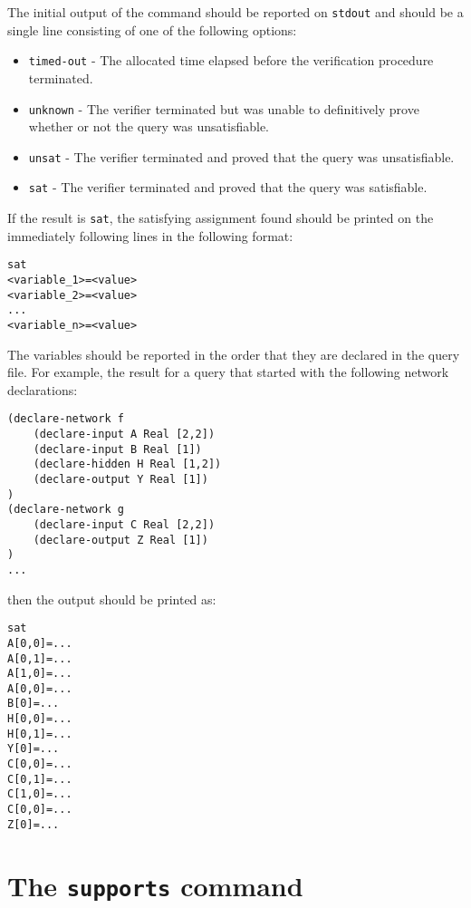

\noindent The initial output of the command should be reported on \texttt{stdout} and should be a single line consisting of one of the following options: 
\begin{itemize}
\item \texttt{timed-out} - The allocated time elapsed before the verification procedure terminated.
\item \texttt{unknown} - The verifier terminated but was unable to definitively prove whether or not the query was unsatisfiable.
\item \texttt{unsat} - The verifier terminated and proved that the query was unsatisfiable.
\item \texttt{sat} - The verifier terminated and proved that the query was satisfiable.
\end{itemize}
If the result is \texttt{sat}, the satisfying assignment found should be printed on the immediately following lines in the following format:
\begin{lstlisting}[style=bash]
sat
<variable_1>=<value>
<variable_2>=<value>
...
<variable_n>=<value>
\end{lstlisting}
The variables should be reported in the order that they are declared in the query file. For example, the result for a \vnnlib{} query that started with the following network declarations:
\begin{lstlisting}[style=bash]
(declare-network f
    (declare-input A Real [2,2])
    (declare-input B Real [1])
    (declare-hidden H Real [1,2])
    (declare-output Y Real [1])
)
(declare-network g
    (declare-input C Real [2,2])
    (declare-output Z Real [1])
)
...
\end{lstlisting}
then the output should be printed as:
\begin{lstlisting}[style=bash]
sat
A[0,0]=...
A[0,1]=...
A[1,0]=...
A[0,0]=...
B[0]=...
H[0,0]=...
H[0,1]=...
Y[0]=...
C[0,0]=...
C[0,1]=...
C[1,0]=...
C[0,0]=...
Z[0]=...
\end{lstlisting}


\section{The \texttt{supports} command}
\label{sec:global_capabilities}

